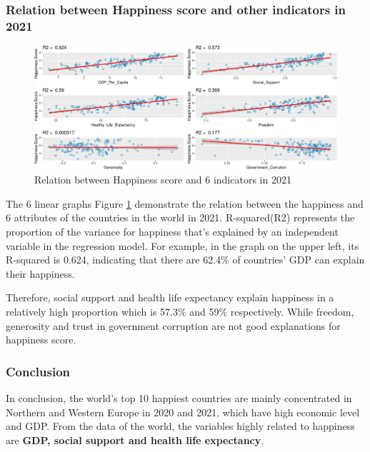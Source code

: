 \documentclass[11pt,a4paper,]{article}
\begin{document}
\hypertarget{relation-between-happiness-score-and-other-indicators-in-2021}{%
\subsubsection{Relation between Happiness score and other indicators in 2021}\label{relation-between-happiness-score-and-other-indicators-in-2021}}

\begin{figure}
\centering
\includegraphics{Assignment4_files/figure-latex/relation-1.pdf}
\caption{\label{fig:relation}Relation between Happiness score and 6 indicators in 2021}
\end{figure}

The 6 linear graphs Figure \ref{fig:relation} demonstrate the relation between the happiness and 6 attributes of the countries in the world in 2021. R-squared(R2) represents the proportion of the variance for happiness that's explained by an independent variable in the regression model. For example, in the graph on the upper left, its R-squared is 0.624, indicating that there are 62.4\% of countries' GDP can explain their happiness.

Therefore, social support and health life expectancy explain happiness in a relatively high proportion which is 57.3\% and 59\% respectively. While freedom, generosity and trust in government corruption are not good explanations for happiness score.

\hypertarget{conclusion}{%
\subsubsection{Conclusion}\label{conclusion}}

In conclusion, the world's top 10 happiest countries are mainly concentrated in Northern and Western Europe in 2020 and 2021, which have high economic level and GDP. From the data of the world, the variables highly related to happiness are \textbf{GDP, social support and health life expectancy}.

\printbibliography
\end{document}
